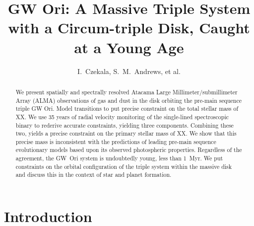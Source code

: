 \documentclass[twocolumn]{aastex6}
\begin{document}
\title{GW Ori: A Massive Triple System with a Circum-triple Disk, Caught at a Young Age}
\author{I.~Czekala, S.~M.~Andrews, et al.} %

\begin{abstract}
We present spatially and spectrally resolved Atacama Large Millimeter/submillimeter Array (ALMA) observations of gas and dust in the disk orbiting the pre-main sequence triple GW Ori. Model transitions to put precise constraint on the total stellar mass of XX. We use 35 years of radial velocity monitoring of the single-lined spectroscopic binary to rederive accurate constraints, yielding three components. Combining these two, yields a precise constraint on the primary stellar mass of XX. We show that this precise mass is inconsistent with the predictions of leading pre-main sequence evolutionary models based upon its observed photospheric properties. Regardless of the agreement, the GW~Ori system is undoubtedly young, less than 1~Myr. We put constraints on the orbital configuration of the triple system within the massive disk and discuss this in the context of star and planet formation.
\end{abstract}


\section{Introduction} \label{sec:intro}

\end{document}
